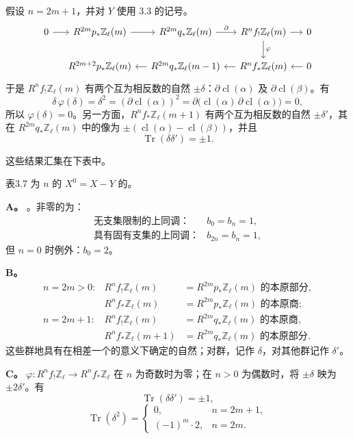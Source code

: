 假设 $n=2m+1$，并对 $Y$ 使用 3.3 的记号。
\[
\begin{tikzcd}[column sep=small]
0\arrow[r]&R^{2m}p_*\mathbb Z_\ell(m)\arrow[r]&R^{2m}q_*\mathbb Z_\ell(m)\arrow[r,"\partial"]&R^nf_!\mathbb Z_\ell(m)\arrow[r]\arrow[d,"\varphi"]&0\\
&R^{2m+2}p_*\mathbb Z_\ell(m)&R^{2m}q_*\mathbb Z_\ell(m-1)\arrow[l]&R^nf_*\mathbb Z_\ell(m)\arrow[l]&0\arrow[l]
\end{tikzcd}
\]
于是 $R^nf_!\mathbb Z_\ell(m)$ 有两个互为相反数的自然 $\pm\delta$：$\partial\operatorname{cl}(\alpha)$ 及 $\partial\operatorname{cl}(\beta)$。有
\[
\delta\,\varphi(\delta)=\delta^2=(\partial\operatorname{cl}(\alpha))^2
=\partial\bigl(\operatorname{cl}(\alpha)\,\partial\operatorname{cl}(\alpha)\bigr)=0,
\]
所以 $\varphi(\delta)=0$。另一方面，$R^nf_*\mathbb Z_\ell(m+1)$ 有两个互为相反数的自然 $\pm\delta'$，其在 $R^{2m}q_*\mathbb Z_\ell(m)$ 中的像为 $\pm(\operatorname{cl}(\alpha)-\operatorname{cl}(\beta))$，并且
\[
\operatorname{Tr}(\delta\delta')=\pm1.
\]

这些结果汇集在下表中。

\begin{SGAresult}{表}{3.7}
为 $n$ 的 $X^0=X-Y$ 的。

\noindent\textbf{A。} 。非零的为：
\[
\begin{array}{ll}
\text{无支集限制的上同调：}&b_0=b_n=1,\\
\text{具有固有支集的上同调：}&b_{2n}=b_n=1,
\end{array}
\]
但 $n=0$ 时例外：$b_0=2$。

\noindent\textbf{B。}
\[
\begin{array}{lll}
n=2m>0:&R^nf_!\mathbb Z_\ell(m)&=R^{2m}p_*\mathbb Z_\ell(m)\text{ 的本原部分},\\
&R^nf_*\mathbb Z_\ell(m)&=R^{2m}p_*\mathbb Z_\ell(m)\text{ 的本原商};\\[3pt]
n=2m+1:&R^nf_!\mathbb Z_\ell(m)&=R^{2m}q_*\mathbb Z_\ell(m)\text{ 的本原商},\\
&R^nf_*\mathbb Z_\ell(m+1)&=R^{2m}q_*\mathbb Z_\ell(m)\text{ 的本原部分}.
\end{array}
\]
这些群地具有在相差一个的意义下确定的自然；对群，记作 $\delta$，对其他群记作 $\delta'$。

\noindent\textbf{C。} $\varphi:R^nf_!\mathbb Z_\ell\to R^nf_*\mathbb Z_\ell$ 在 $n$ 为奇数时为零；在 $n>0$ 为偶数时，将 $\pm\delta$ 映为 $\pm2\delta'$。有
\[
\operatorname{Tr}(\delta\delta')=\pm1,
\]
\[
\operatorname{Tr}(\delta^2)=
\begin{cases}
0,&n=2m+1,\\
(-1)^m\cdot2,&n=2m.
\end{cases}
\]
\end{SGAresult}

